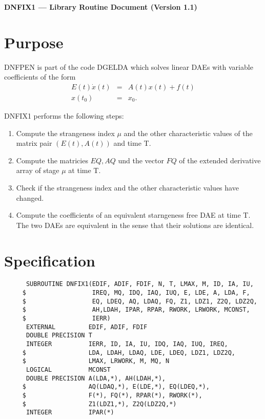 


\begin{center}
  {\bf DNFIX1 --- Library Routine Document (Version 1.1)}
\end{center}

\section{Purpose}

DNFPEN is part of the code DGELDA \cite{KunMRW95} which solves linear
DAEs with variable coefficients of the form
\begin{eqnarray*}
  E(t)\dot{x}(t) &=& A(t)x(t) + f(t)\\
  x(t_0) &=& x_0.
\end{eqnarray*}

DNFIX1 performs the following steps:

\begin{enumerate}
\item Compute the strangeness index $\mu$ and the other characteristic
  values of the matrix pair $(E(t), A(t))$ and time T.
\item Compute the matricies $EQ, AQ$ und the vector $FQ$ of the extended
  derivative array of stage $\mu$ at time T.
\item Check if the strangeness index and the other characteristic values
  have changed.
\item Compute the coefficients of an equivalent starngeness free DAE
  at time T. The two DAEs are equivalent in the sense that their
  solutions are identical.
\end{enumerate}

\section{Specification}

\begin{verbatim}
      SUBROUTINE DNFIX1(EDIF, ADIF, FDIF, N, T, LMAX, M, ID, IA, IU,
     $                  IREQ, MQ, IDQ, IAQ, IUQ, E, LDE, A, LDA, F,
     $                  EQ, LDEQ, AQ, LDAQ, FQ, Z1, LDZ1, Z2Q, LDZ2Q,
     $                  AH,LDAH, IPAR, RPAR, RWORK, LRWORK, MCONST,
     $                  IERR)
      EXTERNAL         EDIF, ADIF, FDIF
      DOUBLE PRECISION T
      INTEGER          IERR, ID, IA, IU, IDQ, IAQ, IUQ, IREQ,
     $                 LDA, LDAH, LDAQ, LDE, LDEQ, LDZ1, LDZ2Q,
     $                 LMAX, LRWORK, M, MQ, N
      LOGICAL          MCONST
      DOUBLE PRECISION A(LDA,*), AH(LDAH,*),
     $                 AQ(LDAQ,*), E(LDE,*), EQ(LDEQ,*),
     $                 F(*), FQ(*), RPAR(*), RWORK(*),
     $                 Z1(LDZ1,*), Z2Q(LDZ2Q,*)
      INTEGER          IPAR(*)
\end{verbatim}


